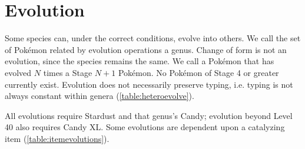 \section{Evolution}
\label{chap:evolution}
Some species can, under the correct conditions, evolve into others.
We call the set of Pokémon related by evolution operations a genus.
Change of form is not an evolution, since the species remains the same.
We call a Pokémon that has evolved $N$ times a Stage $N+1$ Pokémon.
No Pokémon of Stage 4 or greater currently exist.
Evolution does not necessarily preserve typing, i.e. typing is not always constant within genera (\autoref{table:heteroevolve}).

All evolutions require Stardust and that genus's Candy; evolution beyond Level 40 also requires Candy XL.
Some evolutions are dependent upon a catalyzing item (\autoref{table:itemevolutions}).
